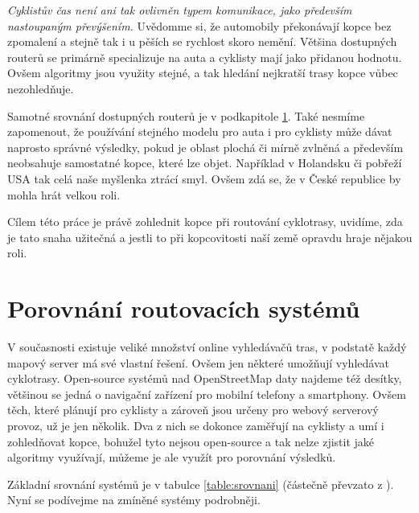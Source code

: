 \documentclass[thesis=B,czech]{FITthesis}[2012/06/26]
\begin{document}
\emph{Cyklistův čas není ani tak ovlivněn typem komunikace, jako především nastoupaným převýšením.} Uvědomme si, že automobily překonávají kopce bez zpomalení a stejně tak i u pěších se rychlost skoro nemění. Většina dostupných routerů se primárně specializuje na auta a cyklisty mají jako přidanou hodnotu. Ovšem algoritmy jsou využity stejné, a tak hledání nejkratší trasy kopce vůbec nezohledňuje.

Samotné srovnání dostupných routerů je v podkapitole \ref{porovnaniSystemu}. Také nesmíme zapomenout, že používání stejného modelu pro auta i pro cyklisty může dávat naprosto správné výsledky, pokud je oblast plochá či mírně zvlněná a především neobsahuje samostatné kopce, které lze objet. Například v Holandsku či pobřeží USA tak celá naše myšlenka ztrácí smyl. Ovšem zdá se, že v České republice by mohla hrát velkou roli.

Cílem této práce je právě zohlednit kopce při routování cyklotrasy, uvidíme, zda je tato snaha užitečná a jestli to při kopcovitosti naší země opravdu hraje nějakou roli.

\section{Porovnání routovacích systémů}
\label{porovnaniSystemu}
V současnosti existuje veliké množství online vyhledávačů tras, v podstatě každý mapový server má své vlastní řešení. Ovšem jen některé umožňují vyhledávat cyklotrasy. Open-source systémů nad OpenStreetMap daty najdeme též desítky, většinou se jedná o navigační zařízení pro mobilní telefony a smartphony. Ovšem těch, které plánují pro cyklisty a zároveň jsou určeny pro webový serverový provoz, už je jen několik. Dva z nich se dokonce zaměřují na cyklisty a umí i zohledňovat kopce, bohužel tyto nejsou open-source a tak nelze zjistit jaké algoritmy využívají, můžeme je ale využít pro porovnání výsledků.

Základní srovnání systémů je v tabulce \ref{table:srovnani} (částečně převzato z \cite{osmwiki-routers}). Nyní se podívejme na zmíněné systémy podrobněji.
\end{document}
